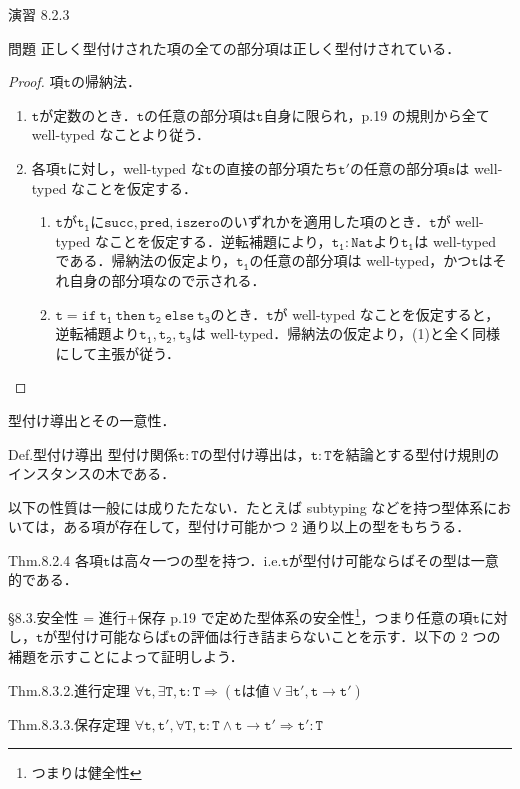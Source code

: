 \documentclass[9pt]{beamer}
\begin{document}
\begin{frame}{演習 8.2.3}
\begin{alertblock}{問題}
正しく型付けされた項の全ての部分項は正しく型付けされている．
\end{alertblock}
\begin{proof}
	項$\mathtt{t}$の帰納法．
\begin{enumerate}
	\item $\mathtt{t}$が定数のとき．$\mathtt{t}$の任意の部分項は$\mathtt{t}$自身に限られ，p.19 の規則から全て well-typed なことより従う．
	\item 各項$\mathtt{t}$に対し，well-typed な$\mathtt{t}$の直接の部分項たち$\mathtt{t'}$の任意の部分項$\mathtt{s}$は well-typed なことを仮定する．\begin{enumerate}
		\item $\mathtt{t}$が$\mathtt{t_{1}}$に$\mathtt{succ, pred, iszero}$のいずれかを適用した項のとき．$\mathtt{t}$が well-typed なことを仮定する．逆転補題により，$\mathtt{t_{1}:Nat}$より$\mathtt{t_{1}}$は well-typed である．帰納法の仮定より，$\mathtt{t_{1}}$の任意の部分項は well-typed，かつ$\mathtt{t}$はそれ自身の部分項なので示される．
		\item $\mathtt{t} =\mathtt{if\ t_{1}\ then\ t_{2}\ else\ t_{3}}$のとき．$\mathtt{t}$が well-typed なことを仮定すると，逆転補題より$\mathtt{t_{1},t_{2}, t_{3}}$は well-typed．帰納法の仮定より，(1)と全く同様にして主張が従う．
	\end{enumerate}
\end{enumerate}
\end{proof}
\end{frame}
\begin{frame}{型付け導出とその一意性．}
\begin{alertblock}{Def.型付け導出}
	型付け関係$\mathtt{t:T}$の型付け導出は，$\mathtt{t:T}$を結論とする型付け規則のインスタンスの木である．
\end{alertblock}
以下の性質は一般には成りたたない．たとえば subtyping などを持つ型体系においては，ある項が存在して，型付け可能かつ 2 通り以上の型をもちうる．
\begin{dblock}{Thm.8.2.4}
各項$\mathtt{t}$は高々一つの型を持つ．i.e.$\mathtt{t}$が型付け可能ならばその型は一意的である．
\end{dblock}
\end{frame}
\begin{frame}{\S 8.3.安全性 = 進行+保存}
p.19 で定めた型体系の安全性\footnote{つまりは健全性}，つまり任意の項$\mathtt{t}$に対し，$\mathtt{t}$が型付け可能ならば$\mathtt{t}$の評価は行き詰まらないことを示す．以下の 2 つの補題を示すことによって証明しよう．\begin{dblock}{Thm.8.3.2.進行定理}
$\forall \mathtt{t},\exists\mathtt{T}, \mathtt{t:T}\Rightarrow (\mathtt{t}\text{は値}\lor\exists \mathtt{t'}, \mathtt{t\rightarrow t'})$
\end{dblock}
\begin{dblock}{Thm.8.3.3.保存定理}
	$\forall \mathtt{t,t',\forall{T}, t:T\land t\rightarrow t'\Rightarrow t':T}$
\end{dblock}
\end{frame}
\end{document}
